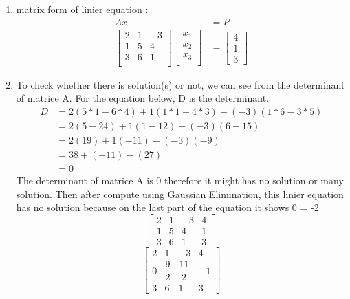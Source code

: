 \documentclass{article}
\begin{document}
\begin{enumerate}
  \begin{enumerate}
      \item matrix form of linier equation :
      \begin{align*}
          A x &= P \\ \begin{bmatrix} 2 & 1 & -3\\ 1 & 5 & 4\\3 & 6 & 1\\ \end{bmatrix} \begin{bmatrix} x_{1}\\x_{2}\\x_{3}\\ \end{bmatrix} &= \begin{bmatrix} 4\\1\\3 \end{bmatrix}
      \end{align*}
      \item To check whether there is solution(s) or not, we can see from the determinant of matrice A. For the equation below, D is the determinant. 
      \begin{align*}
      D &= 2(5*1 - 6*4) + 1(1*1 - 4*3) - (-3)(1*6 - 3*5) \\ &= 2(5 - 24) + 1(1 - 12) - (-3)(6 - 15) \\ &= 2(19) + 1(-11) - (-3)(-9) \\ &= 38 + (-11) - (27) \\ &= 0
      \end{align*}
      The determinant of matrice A is 0 therefore it might has no solution or many solution. Then after compute using Gaussian Elimination, this linier equation has no solution because on the last part of the equation it shows 0 = -2
      \begin{equation}
          \left[ \begin{array}{ccc|c} \label{eq1} 2 & 1 & -3 & 4 \\ 1 & 5 & 4 & 1 \\ 3 & 6 & 1 & 3 \end{array} \right] \end{equation} 
      \begin{equation}
        \left [\begin{array}{ccc|c} \label{eq2} 2 & 1 & -3 & 4\\ 0 & \dfrac{9}{2} & \dfrac{11}{2} & -1\\3 & 6 & 1 &3 \end{array}\right]

\end{equation}
\end{enumerate}
\end{enumerate}
\end{document}
